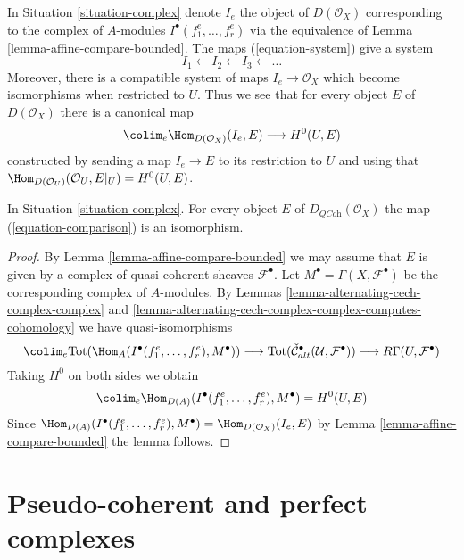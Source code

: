 \noindent
In Situation \ref{situation-complex} denote $I_e$ the object of
$D(\mathcal{O}_X)$ corresponding to the complex of $A$-modules
$I^\bullet(f_1^e, \ldots, f_r^e)$ via the equivalence of
Lemma \ref{lemma-affine-compare-bounded}. The maps
(\ref{equation-system}) give a system
$$
I_1 \leftarrow
I_2 \leftarrow
I_3 \leftarrow \ldots
$$
Moreover, there is a compatible system of maps $I_e \to \mathcal{O}_X$
which become isomorphisms when restricted to $U$. Thus we see that for
every object $E$ of $D(\mathcal{O}_X)$ there is a canonical map
\begin{equation}
\label{equation-comparison}
\colim_e \Hom_{D(\mathcal{O}_X)}(I_e, E) \longrightarrow H^0(U, E)
\end{equation}
constructed by sending a map $I_e \to E$ to its restriction to $U$
and using that
$\Hom_{D(\mathcal{O}_U)}(\mathcal{O}_U, E|_U) = H^0(U, E)$.

\begin{proposition}
\label{proposition-represent-cohomology-class-on-open}
In Situation \ref{situation-complex}. For every object $E$
of $D_{\textit{QCoh}}(\mathcal{O}_X)$ the map
(\ref{equation-comparison}) is an isomorphism.
\end{proposition}

\begin{proof}
By Lemma \ref{lemma-affine-compare-bounded} we may assume that $E$
is given by a complex of quasi-coherent sheaves $\mathcal{F}^\bullet$.
Let $M^\bullet = \Gamma(X, \mathcal{F}^\bullet)$ be the corresponding
complex of $A$-modules. By
Lemmas \ref{lemma-alternating-cech-complex-complex} and
\ref{lemma-alternating-cech-complex-complex-computes-cohomology}
we have quasi-isomorphisms
$$
\colim_e \text{Tot}(\Hom_A(I^\bullet(f_1^e, \ldots, f_r^e), M^\bullet))
\longrightarrow
\text{Tot}(\check{\mathcal{C}}_{alt}^\bullet(\mathcal{U}, \mathcal{F}^\bullet))
\longrightarrow
R\Gamma(U, \mathcal{F}^\bullet)
$$
Taking $H^0$ on both sides we obtain
$$
\colim_e \Hom_{D(A)}(I^\bullet(f_1^e, \ldots, f_r^e), M^\bullet)
=
H^0(U, E)
$$
Since $\Hom_{D(A)}(I^\bullet(f_1^e, \ldots, f_r^e), M^\bullet) =
\Hom_{D(\mathcal{O}_X)}(I_e, E)$ by
Lemma \ref{lemma-affine-compare-bounded} the lemma follows.
\end{proof}



\section{Pseudo-coherent and perfect complexes}
\label{section-spell-out}

